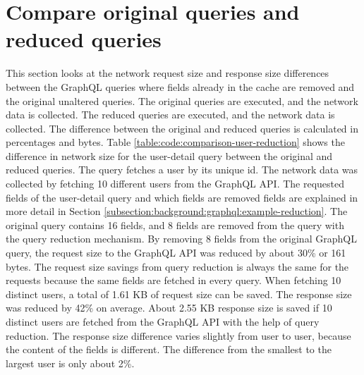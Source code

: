\section{Compare original queries and reduced queries}

This section looks at the network request size and response size differences between the GraphQL queries where fields already in the cache are removed and the original unaltered queries. The original queries are executed, and the network data is collected. The reduced queries are executed, and the network data is collected. The difference between the original and reduced queries is calculated in percentages and bytes. Table \ref{table:code:comparison-user-reduction} shows the difference in network size for the user-detail query between the original and reduced queries. The query fetches a user by its unique id. The network data was collected by fetching 10 different users from the GraphQL \ac{API}. The requested fields of the user-detail query and which fields are removed fields are explained in more detail in Section \ref{subsection:background:graphql:example-reduction}. The original query contains 16 fields, and 8 fields are removed from the query with the query reduction mechanism. By removing 8 fields from the original GraphQL query, the request size to the GraphQL \ac{API} was reduced by about 30\% or 161 bytes. The request size savings from query reduction is always the same for the requests because the same fields are fetched in every query. When fetching 10 distinct users, a total of 1.61 KB of request size can be saved. The response size was reduced by 42\% on average. About 2.55 KB response size is saved if 10 distinct users are fetched from the GraphQL \ac{API} with the help of query reduction. The response size difference varies slightly from user to user, because the content of the fields is different. The difference from the smallest to the largest user is only about 2\%.

